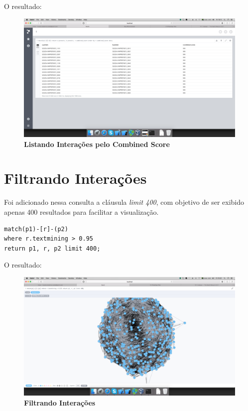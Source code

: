 \documentclass[a4paper, 12pt]{article}
\begin{document}
O resultado: 
\begin{figure}[H]
  \centering
  \includegraphics[width=1\textwidth]{3}
  \caption[3 - Listando Interações pelo Combined Score]{\textbf{Listando Interações pelo Combined Score}}
\end{figure} 

\section{Filtrando Interações}
Foi adicionado nessa consulta a cláusula \emph{limit 400}, com objetivo de ser exibido apenas 400 resultados para facilitar a visualização.

\begin{lstlisting}[frame=single]
match(p1)-[r]-(p2)
where r.textmining > 0.95
return p1, r, p2 limit 400;
\end{lstlisting} 

O resultado: 
\begin{figure}[H]
  \centering
  \includegraphics[width=1\textwidth]{4}
  \caption[4 - Filtrando Interações]{\textbf{Filtrando Interações}}
\end{figure}
\end{document}
